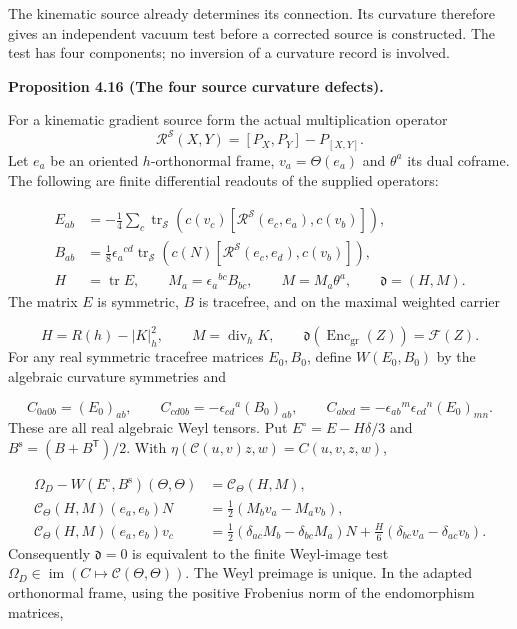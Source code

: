 \documentclass[
  english,
  11pt,
  reqno]{amsart}
\makeatletter
\newcommand{\pandocstatementheading}[1]{%
  \par\addpenalty{\@beginparpenalty}%
  \addvspace{.5\baselineskip plus .2\baselineskip minus .2\baselineskip}%
  {\normalfont\bfseries #1\par}%
  \nobreak\@afterindenttrue\@afterheading
}
\makeatother
\begin{document}
The kinematic source already determines its connection. Its curvature
therefore gives an independent vacuum test before a corrected source is
constructed. The test has four components; no inversion of a curvature
record is involved.

\pandocstatementheading{\leavevmode{}\label{prop:online-four-source-curvature-defects}Proposition 4.16 (The four source curvature defects).}

For a kinematic gradient source form the actual multiplication operator
\[
\mathcal R^{\mathscr S}(X,Y)=[P_X,P_Y]-P_{[X,Y]}.
\] Let \(e_a\) be an oriented \(h\)-orthonormal frame,
\(v_a=\Theta(e_a)\) and \(\theta^a\) its dual coframe. The following are
finite differential readouts of the supplied operators:

\label{eq:online-source-four-commutator-readouts} \[
\begin{aligned}
E_{ab}
&=-\frac14\sum_c\operatorname{tr}_{\mathscr S}
\left(c(v_c)[\mathcal R^{\mathscr S}(e_c,e_a),c(v_b)]\right),\\
B_{ab}
&=\frac18\epsilon_a{}^{cd}\operatorname{tr}_{\mathscr S}
\left(c(N)[\mathcal R^{\mathscr S}(e_c,e_d),c(v_b)]\right),\\
H&=\operatorname{tr}E,
\qquad M_a=\epsilon_a{}^{bc}B_{bc},
\qquad M=M_a\theta^a,
\qquad\mathfrak d=(H,M).
\end{aligned}
\] The matrix \(E\) is symmetric, \(B\) is tracefree, and on the maximal
weighted carrier

\label{eq:online-source-defect-equals-constraint} \[
H=R(h)-|K|_h^2,\qquad
M=\operatorname{div}_hK,\qquad
\mathfrak d(\operatorname{Enc}_{\mathrm{gr}}(Z))=\mathcal F(Z).
\] For any real symmetric tracefree matrices \(E_0,B_0\), define
\(W(E_0,B_0)\) by the algebraic curvature symmetries and

\label{eq:online-source-weyl-component-convention} \[
C_{0a0b}=(E_0)_{ab},\qquad
C_{cd0b}=-\epsilon_{cd}{}^a(B_0)_{ab},\qquad
C_{abcd}=-\epsilon_{ab}{}^m\epsilon_{cd}{}^n(E_0)_{mn}.
\] These are all real algebraic Weyl tensors. Put
\(E^\circ=E-H\delta/3\) and \(B^{\mathrm s}=(B+B^{\mathsf T})/2\). With
\(\eta(\mathcal C(u,v)z,w)=C(u,v,z,w)\),

\label{eq:online-source-four-defect-complement} \[
\begin{aligned}
\Omega_D-W(E^\circ,B^{\mathrm s})(\Theta,\Theta)
&=\mathcal C_\Theta(H,M),\\
\mathcal C_\Theta(H,M)(e_a,e_b)N
&=\frac12(M_bv_a-M_av_b),\\
\mathcal C_\Theta(H,M)(e_a,e_b)v_c
&=\frac12(\delta_{ac}M_b-\delta_{bc}M_a)N
+\frac H6(\delta_{bc}v_a-\delta_{ac}v_b).
\end{aligned}
\] Consequently \(\mathfrak d=0\) is equivalent to the finite Weyl-image
test
\(\Omega_D\in\operatorname{im}(C\mapsto\mathcal C(\Theta,\Theta))\). The
Weyl preimage is unique. In the adapted orthonormal frame, using the
positive Frobenius norm of the endomorphism matrices,
\end{document}
